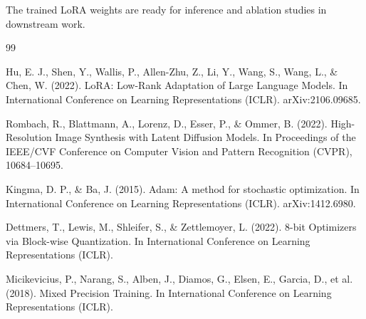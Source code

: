 \documentclass[11pt]{article}
\begin{document}
The trained LoRA weights are ready for inference and ablation studies in downstream work.

\begin{thebibliography}{99}

 Hu, E. J., Shen, Y., Wallis, P., Allen-Zhu, Z., Li, Y., Wang, S., Wang, L., \& Chen, W. (2022). LoRA: Low-Rank Adaptation of Large Language Models. In International Conference on Learning Representations (ICLR). arXiv:2106.09685.

 Rombach, R., Blattmann, A., Lorenz, D., Esser, P., \& Ommer, B. (2022). High-Resolution Image Synthesis with Latent Diffusion Models. In Proceedings of the IEEE/CVF Conference on Computer Vision and Pattern Recognition (CVPR), 10684--10695.

 Kingma, D. P., \& Ba, J. (2015). Adam: A method for stochastic optimization. In International Conference on Learning Representations (ICLR). arXiv:1412.6980.

 Dettmers, T., Lewis, M., Shleifer, S., \& Zettlemoyer, L. (2022). 8-bit Optimizers via Block-wise Quantization. In International Conference on Learning Representations (ICLR).

 Micikevicius, P., Narang, S., Alben, J., Diamos, G., Elsen, E., Garcia, D., et al. (2018). Mixed Precision Training. In International Conference on Learning Representations (ICLR).

\end{thebibliography}
\end{document}
